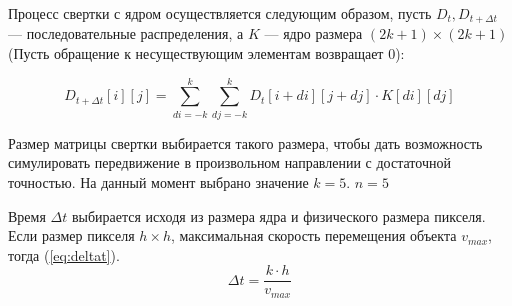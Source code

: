 Процесс свертки с ядром осуществляется следующим образом, пусть $D_t, D_{t+\Delta t}$ ---
последовательные распределения, а $K$ --- ядро размера $(2k+1) \times (2k+1)$
(Пусть обращение к несуществующим элементам возвращает 0):

\begin{equation}
  D_{t+\Delta t}[i][j] = \sum\limits_{di=-k}^k \sum\limits_{dj=-k}^k D_t[i+di][j+dj] \cdot K[di][dj]
\end{equation}

Размер матрицы свертки выбирается такого размера, чтобы дать возможность симулировать
передвижение в произвольном направлении с достаточной точностью. На данный момент выбрано
значение $k = 5$. $n = 5$

Время $\Delta t$ выбирается исходя из размера ядра и физического размера пикселя.
Если размер пикселя $h \times h$, максимальная скорость перемещения объекта $v_{max}$,
тогда (\ref{eq:deltat}). 
\begin{equation}\label{eq:deltat}
  \Delta t = \frac {k \cdot h} {v_{max}}
\end{equation}

